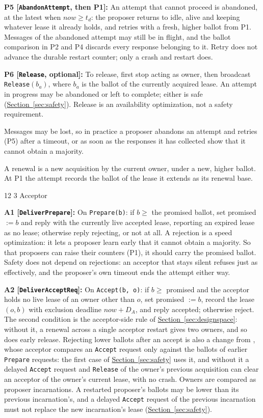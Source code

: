 \documentclass[final,5p,times,twocolumn,number]{elsarticle}
\makeatletter
\newcommand{\code}[1]{\texttt{#1}}
\newcommand{\invitem}[1]{\smallskip\noindent\textbf{#1:} }
\newcommand{\secref}[1]{\hyperref[#1]{Section~\ref*{#1}}}
\renewcommand\subsection{\@startsection{subsection}{2}{\z@}%
           {12\p@ \@plus 6\p@ \@minus 3\p@}%
           {3\p@ \@plus 6\p@ \@minus 3\p@}%
           {\normalfont\normalsize\bfseries}}
\makeatother
\begin{document}
\invitem{P5 [\code{AbandonAttempt}, then P1]}An attempt that cannot proceed is abandoned, at the latest when $now \geq t_d$: the proposer returns to idle, alive and keeping whatever lease it already holds, and retries with a fresh, higher ballot from P1.  Messages of the abandoned attempt may still be in flight, and the ballot comparison in P2 and P4 discards every response belonging to it.  Retry does not advance the durable restart counter; only a crash and restart does.

\invitem{P6 [\code{Release}, optional]}To release, first stop acting as owner, then broadcast \code{Release}$(b_a)$, where $b_a$ is the ballot of the currently acquired lease.  An attempt in progress may be abandoned or left to complete; either is safe (\secref{sec:safety}).  Release is an availability optimization, not a safety requirement.

\smallskip
Messages may be lost, so in practice a proposer abandons an attempt and retries (P5) after a timeout, or as soon as the responses it has collected show that it cannot obtain a majority.

A renewal is a new acquisition by the current owner, under a new, higher ballot.  At P1 the attempt records the ballot of the lease it extends as its renewal base.

\subsection{Acceptor}

\invitem{A1 [\code{DeliverPrepare}]}On \code{Prepare(b)}: if $b \geq$ the promised ballot, set promised $:= b$ and reply with the currently live accepted lease, reporting an expired lease as no lease; otherwise reply rejecting, or not at all.  A rejection is a speed optimization: it lets a proposer learn early that it cannot obtain a majority.  So that proposers can raise their counters (P1), it should carry the promised ballot.  Safety does not depend on rejections: an acceptor that stays silent refuses just as effectively, and the proposer's own timeout ends the attempt either way.

\invitem{A2 [\code{DeliverAcceptReq}]}On \code{Accept(b, o)}: if $b \geq$ promised and the acceptor holds no live lease of an owner other than $o$, set promised $:= b$, record the lease $(o, b)$ with exclusion deadline $now + D_A$, and reply accepted; otherwise reject.  The second condition is the acceptor-side rule of \secref{sec:designspace}: without it, a renewal across a single acceptor restart gives two owners, and so does early release.  Rejecting lower ballots after an accept is also a change from \cite{ref1}, whose acceptor compares an \code{Accept} request only against the ballots of earlier \code{Prepare} requests: the first case of \secref{sec:safety} uses it, and without it a delayed \code{Accept} request and \code{Release} of the owner's previous acquisition can clear an acceptor of the owner's current lease, with no crash.  Owners are compared as proposer incarnations.  A restarted proposer's ballots may be lower than its previous incarnation's, and a delayed \code{Accept} request of the previous incarnation must not replace the new incarnation's lease (\secref{sec:safety}).
\end{document}
